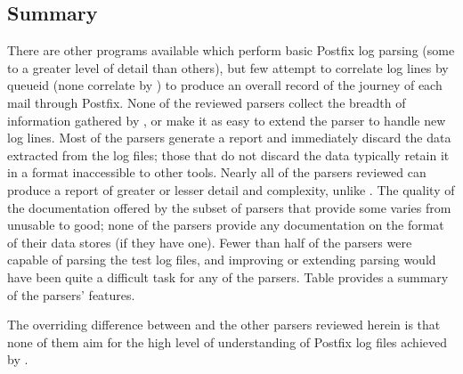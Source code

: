 \subsection{Summary}

There are other programs available which perform basic Postfix log parsing
(some to a greater level of detail than others), but few attempt to
correlate log lines by queueid (none correlate by \pid{}) to produce an
overall record of the journey of each mail through Postfix.  None of the
reviewed parsers collect the breadth of information gathered by
\parsername{}, or make it as easy to extend the parser to handle new log
lines.  Most of the parsers generate a report and immediately discard the
data extracted from the log files; those that do not discard the data
typically retain it in a format inaccessible to other tools.  Nearly all of
the parsers reviewed can produce a report of greater or lesser detail and
complexity, unlike \parsername{}.  The quality of the documentation offered
by the subset of parsers that provide some varies from unusable to good;
none of the parsers provide any documentation on the format of their data
stores (if they have one).  Fewer than half of the parsers were capable of
parsing the \numberOFlogFILES{} test log files, and improving or extending
parsing would have been quite a difficult task for any of the parsers.
Table  provides a summary of the
parsers' features.

The overriding difference between \parsername{} and the other parsers
reviewed herein is that none of them aim for the high level of
understanding of Postfix log files achieved by \parsername{}.


